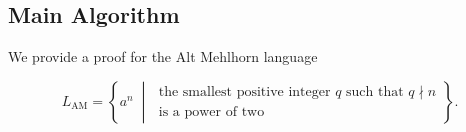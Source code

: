\documentclass[UTF8]{article}
\begin{document}

  















\subsection{Main Algorithm}

We provide a proof for the Alt Mehlhorn language

\[
L_{\mathrm{AM}}
=
\left\{
a^n
\;\middle|\;
\begin{array}{l}
\text{the smallest positive integer } q
\text{ such that } q \nmid n\\
\text{is a power of two}
\end{array}
\right\}.
\]

\newpage



\end{document}
